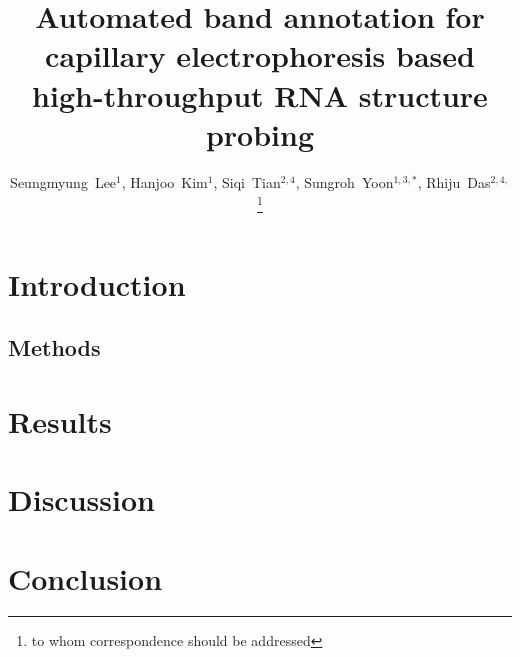 \documentclass[letter]{bioinfo}
\begin{document}

\title[Automated band annotation for capillary electrophoresis]{Automated band annotation for capillary electrophoresis based high-throughput RNA structure probing}
\author[Lee \textit{et~al}]
{
Seungmyung~Lee$^{1}$,
Hanjoo~Kim$^{1}$,
Siqi~Tian$^{2,4}$,
Sungroh~Yoon$^{1,3,*}$,
Rhiju~Das$^{2,4,}$\footnote{to whom correspondence should be addressed}
}
\address{
$^{1}$Department of ECE, Seoul National University, Seoul 151-744, Korea, 
$^{2}$School of Medicine, Stanford, CA 94305, USA,
$^{3}$Interdisciplinary program in Bionformatics, Seoul National University, Seoul 151-744, Korea,
$^{4}$Departments of Biochemistry and Physics, Stanford, CA 94305, USA
}

\history{}

\editor{}

\maketitle




\section{Introduction}\label{s:introduction}


\begin{methods}
\section{Methods}\label{s:method}

\end{methods}

\section{Results}\label{s:result}


\section{Discussion}\label{s:discussion}


\section{Conclusion}\label{s:conclusion}

\end{document}
